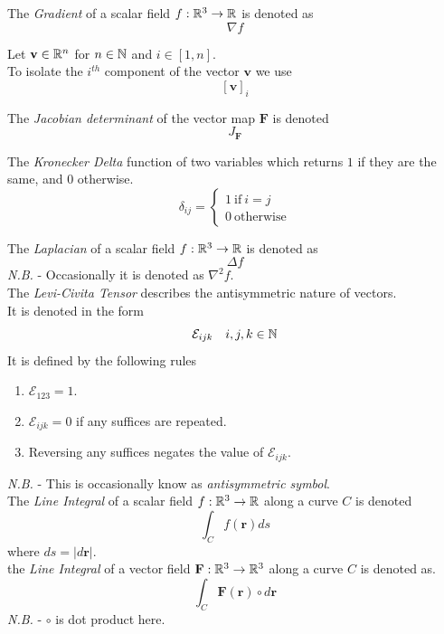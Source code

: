 \documentclass[11pt,a4paper]{article}
\begin{document}
The \textit{Gradient} of a scalar field $f:\mathbb{R}^3\to\mathbb{R}$ is denoted as
$$\nabla f$$

Let $\textbf{v}\in\mathbb{R}^n$ for $n\in\mathbb{N}$ and $i\in[1,n]$.\\
To isolate the $i^{th}$ component of the vector $\textbf{v}$ we use
$$[\textbf{v}]_i$$

The \textit{Jacobian determinant} of the vector map $\textbf{F}$ is denoted
$$J_\textbf{F}$$

The \textit{Kronecker Delta} function of two variables which returns $1$ if they are the same, and $0$ otherwise.
$$\delta_{ij} = \begin{cases} 1\ \mathrm{if}\ i=j \\ 0\ \mathrm{otherwise}\end{cases}$$

The \textit{Laplacian} of a scalar field $f:\mathbb{R}^3\to\mathbb{R}$ is denoted as
$$\Delta f$$
\textit{N.B.} - Occasionally it is denoted as $\nabla^2f$.\\

 The \textit{Levi-Civita Tensor} describes the antisymmetric nature of vectors.\\
It is denoted in the form
$$\mathcal{E}_{ijk}\quad i,j,k\in\mathbb{N}$$
It is defined by the following rules
\begin{enumerate}[label=\roman*)]
  \item $\mathcal{E}_{123}=1$.
  \item $\mathcal{E}_{ijk}=0$ if any suffices are repeated.
  \item Reversing any suffices negates the value of $\mathcal{E}_{ijk}$.
\end{enumerate}
\textit{N.B.} - This is occasionally know as \textit{antisymmetric symbol}.\\

The \textit{Line Integral} of a scalar field $f:\mathbb{R}^3\to\mathbb{R}$ along a curve $C$ is denoted
$$\int_Cf(\textbf{r})ds$$
where $ds=|d\textbf{r}|$.\\

the \textit{Line Integral} of a vector field $\textbf{F}:\mathbb{R}^3\to\mathbb{R}^3$ along a curve $C$ is denoted as.
$$\int_C\textbf{F}(\textbf{r})\circ d\textbf{r}$$
\textit{N.B.} - $\circ$ is dot product here.\\
\end{document}
